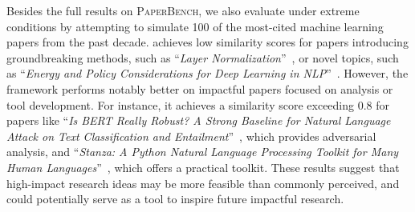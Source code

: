Besides the full results on \textsc{PaperBench}, we also evaluate \envname under extreme conditions by attempting to simulate 100 of the most-cited machine learning papers from the past decade. \envname achieves low similarity scores for papers introducing groundbreaking methods, such as ``\textit{Layer Normalization}''~\citep{ba2016layer}, or novel topics, such as ``\textit{Energy and Policy Considerations for Deep Learning in NLP}''~\citep{strubell2019energy}. However, the framework performs notably better on impactful papers focused on analysis or tool development. For instance, it achieves a similarity score exceeding 0.8 for papers like ``\textit{Is BERT Really Robust? A Strong Baseline for Natural Language Attack on Text Classification and Entailment}''~\citep{jin2020bert}, which provides adversarial analysis, and ``\textit{Stanza: A Python Natural Language Processing Toolkit for Many Human Languages}''~\citep{qi2020stanza}, which offers a practical toolkit. These results suggest that high-impact research ideas may be more feasible than commonly perceived, and \envname could potentially serve as a tool to inspire future impactful research.



